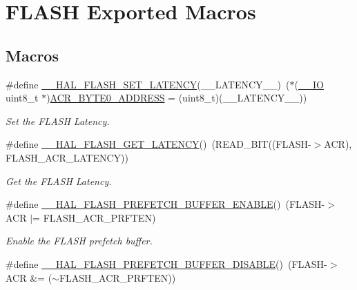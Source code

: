 \hypertarget{group___f_l_a_s_h___exported___macros}{}\section{F\+L\+A\+SH Exported Macros}
\label{group___f_l_a_s_h___exported___macros}
\subsection*{Macros}
\begin{DoxyCompactItemize}
\item 
\#define \mbox{\hyperlink{group___f_l_a_s_h___exported___macros_gac1c9f459b798cc3700b90a6245df5a1a}{\+\_\+\+\_\+\+H\+A\+L\+\_\+\+F\+L\+A\+S\+H\+\_\+\+S\+E\+T\+\_\+\+L\+A\+T\+E\+N\+CY}}(\+\_\+\+\_\+\+L\+A\+T\+E\+N\+C\+Y\+\_\+\+\_\+)~($\ast$(\mbox{\hyperlink{core__sc300_8h_aec43007d9998a0a0e01faede4133d6be}{\+\_\+\+\_\+\+IO}} uint8\+\_\+t $\ast$)\mbox{\hyperlink{group___f_l_a_s_h___private___constants_gaeaca61fbcff69df08100280868bff214}{A\+C\+R\+\_\+\+B\+Y\+T\+E0\+\_\+\+A\+D\+D\+R\+E\+SS}} = (uint8\+\_\+t)(\+\_\+\+\_\+\+L\+A\+T\+E\+N\+C\+Y\+\_\+\+\_\+))
\begin{DoxyCompactList}\small\item\em Set the F\+L\+A\+SH Latency. \end{DoxyCompactList}\item 
\#define \mbox{\hyperlink{group___f_l_a_s_h___exported___macros_gaa537e44d74ce35ff5bfef80edf03f895}{\+\_\+\+\_\+\+H\+A\+L\+\_\+\+F\+L\+A\+S\+H\+\_\+\+G\+E\+T\+\_\+\+L\+A\+T\+E\+N\+CY}}()~(R\+E\+A\+D\+\_\+\+B\+IT((F\+L\+A\+SH-\/$>$A\+CR), F\+L\+A\+S\+H\+\_\+\+A\+C\+R\+\_\+\+L\+A\+T\+E\+N\+CY))
\begin{DoxyCompactList}\small\item\em Get the F\+L\+A\+SH Latency. \end{DoxyCompactList}\item 
\#define \mbox{\hyperlink{group___f_l_a_s_h___exported___macros_gad36059641057f824516303ea92734e6f}{\+\_\+\+\_\+\+H\+A\+L\+\_\+\+F\+L\+A\+S\+H\+\_\+\+P\+R\+E\+F\+E\+T\+C\+H\+\_\+\+B\+U\+F\+F\+E\+R\+\_\+\+E\+N\+A\+B\+LE}}()~(F\+L\+A\+SH-\/$>$A\+CR $\vert$= F\+L\+A\+S\+H\+\_\+\+A\+C\+R\+\_\+\+P\+R\+F\+T\+EN)
\begin{DoxyCompactList}\small\item\em Enable the F\+L\+A\+SH prefetch buffer. \end{DoxyCompactList}\item 
\#define \mbox{\hyperlink{group___f_l_a_s_h___exported___macros_ga646a4cb92e85659334d14a8c78f0ede8}{\+\_\+\+\_\+\+H\+A\+L\+\_\+\+F\+L\+A\+S\+H\+\_\+\+P\+R\+E\+F\+E\+T\+C\+H\+\_\+\+B\+U\+F\+F\+E\+R\+\_\+\+D\+I\+S\+A\+B\+LE}}()~(F\+L\+A\+SH-\/$>$A\+CR \&= ($\sim$F\+L\+A\+S\+H\+\_\+\+A\+C\+R\+\_\+\+P\+R\+F\+T\+EN))

\end{DoxyCompactItemize}
